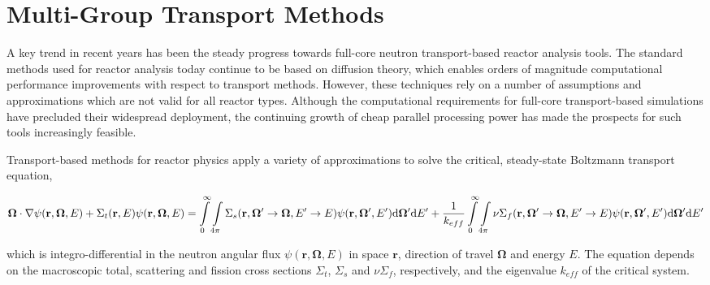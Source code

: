 \section{Multi-Group Transport Methods}
\label{sec:mg-theory}

A key trend in recent years has been the steady progress towards full-core neutron transport-based reactor analysis tools. The standard methods used for reactor analysis today continue to be based on diffusion theory, which enables orders of magnitude computational performance improvements with respect to transport methods. However, these techniques rely on a number of assumptions and approximations which are not valid for all reactor types. Although the computational requirements for full-core transport-based simulations have precluded their widespread deployment, the continuing growth of cheap parallel processing power has made the prospects for such tools increasingly feasible.

Transport-based methods for reactor physics apply a variety of approximations to solve the critical, steady-state Boltzmann transport equation,

\begin{dmath}
\label{eqn:transport-ce}
\mathbf{\Omega} \cdot \nabla \psi(\mathbf{r},\mathbf{\Omega},E) + \Sigma_{t}(\mathbf{r},E)\psi(\mathbf{r},\mathbf{\Omega},E) = \int\displaylimits_{0}^{\infty}\int\displaylimits_{4\pi} \Sigma_{s}(\mathbf{r},{\mathbf{\Omega'}\rightarrow\mathbf{\Omega}},{E'\rightarrow E}) \psi(\mathbf{r},\mathbf{\Omega'},E') \mathrm{d}\mathbf{\Omega'} \mathrm{d}E' + \frac{1}{k_{eff}}\int\displaylimits_{0}^{\infty}\int\displaylimits_{4\pi} \nu\Sigma_{f}(\mathbf{r},{\mathbf{\Omega'}\rightarrow \mathbf{\Omega}},{E'\rightarrow E})\psi(\mathbf{r},\mathbf{\Omega'},E') \mathrm{d}\mathbf{\Omega'} \mathrm{d}E'
\end{dmath}

\noindent which is integro-differential in the neutron angular flux $\psi(\mathbf{r},\mathbf{\Omega},E)$ in space $\mathbf{r}$, direction of travel $\mathbf{\Omega}$ and energy $E$. The equation depends on the macroscopic total, scattering and fission cross sections $\Sigma_{t}$, $\Sigma_{s}$ and $\nu\Sigma_{f}$, respectively, and the eigenvalue $k_{eff}$ of the critical system.

